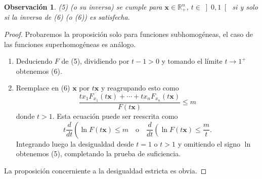\documentclass[a4paper,fleqn]{cas-dc}
\begin{document}
\newtheorem{remark}{Observación}
\begin{remark}
(5) (o su inversa) se cumple para $\bm{x}\in\mathds{R}^{n}_{+}$, $t\in\left]0,1\right[$ si y solo si la inversa de (6) (o (6)) es satisfecha.
\end{remark}
\begin{proof}
Probaremos la proposición solo para funciones subhomogéneas, el caso de las funciones superhomogéneas es análogo.
\begin{enumerate}
	\item[Necesidad] Deduciendo $F$ de (5), dividiendo por $t-1>0$ y tomando el límite $t\to1^{+}$ obtenemos (6).
	\item[Suficiencia] Reemplace en (6) $\bm{x}$ por $t\bm{x}$ y reagrupando esto como \[ \frac{tx_{1}F_{x_{1}}\left(t\bm{x}\right)+\cdots+tx_{n}F_{x_{n}}\left(t\bm{x}\right)}{F\left(t\bm{x}\right)}\leq m \] donde $t>1$. Esta ecuación puede ser reescrita como \[ t\frac{d}{dt}\left(\ln F\left(t\bm{x}\right)\leq m\quad\text{o}\quad\frac{d}{dt}\left(\ln F\left(t\bm{x}\right)\leq\dfrac{m}{t}. \] Integrando luego la desigualdad desde $t=1$ o $t>1$ y omitiendo el signo $\ln$ obtenemos (5), completando la prueba de suficiencia.
\end{enumerate}
La proposición concerniente a la desigualdad estricta es obvia.
\end{proof}
\end{document}
